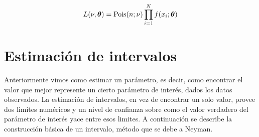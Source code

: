 \begin{equation}
  L(\nu,\bm{\theta}) = \operatorname{Pois}(n;\nu) \prod_{i=1}^{N} f(x_i; \bm{\theta})
\end{equation}

\section{Estimación de intervalos}

Anteriormente vimos como estimar un parámetro, es decir, como encontrar el
valor que mejor represente un cierto parámetro de interés, dados los datos
observados. La estimación de intervalos, en vez de encontrar un solo valor,
provee dos limites numéricos y un nivel de confianza sobre como el valor
verdadero del parámetro de interés yace entre esos limites. A continuación
se describe la construcción básica de un intervalo, método que se debe a
Neyman.








